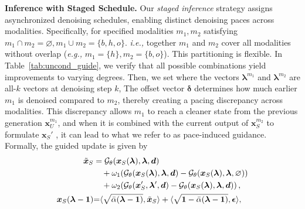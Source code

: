 \noindent \textbf{Inference with Staged Schedule.}
Our \emph{staged inference} strategy assigns asynchronized denoising schedules, enabling distinct denoising paces across modalities. Specifically, for specified modalities $m_1,m_2$ satisfying $m_1 \cap m_2 = \varnothing, m_1 \cup m_2 = \{b,h,o\}.$ \textit{i.e.,} together $m_1$ and $m_2$ cover all modalities without overlap (\textit{e.g.,} $m_1 = \{h\}, m_2 = \{b,o\}$). This partitioning is flexible. In Table~\ref{tab:uncond_guide}, we verify that all possible combinations yield improvements to varying degrees. 
Then, we set
where the vectors $\boldsymbol{\lambda}^{m_1}$ and $\boldsymbol{\lambda}^{m_2}$ are all-$k$ vectors at denoising step $k$,  The offset vector $\boldsymbol{\delta}$ determines how much earlier $m_1$ is denoised compared to $m_2$, thereby creating a pacing discrepancy across modalities. This discrepancy allows $m_1$ to reach a cleaner state from the previous generation ${\boldsymbol{x}}_U^{m_1}$, and when it is combined with the current output of ${\boldsymbol{x}}_S^{m_2}$ to formulate ${\boldsymbol{x}}_S'$ , it can lead to what we refer to as pace-induced guidance. Formally, the guided update is given by
\begin{align}
\tilde{\boldsymbol{x}}_{S}
&= \mathcal{G}_\theta(\boldsymbol{x}_{S}(\boldsymbol\lambda), \boldsymbol\lambda,\boldsymbol{d}) \notag \\
&\quad + \omega_{1}\!\left(\mathcal{G}_\theta(\boldsymbol{x}_{S}(\boldsymbol\lambda), \boldsymbol\lambda,\boldsymbol{d})
    - \mathcal{G}_\theta(\boldsymbol{x}_{S}(\boldsymbol\lambda), \boldsymbol\lambda,\varnothing)\right) \label{equation:textcfg2} \\
&\quad + \omega_{2}\!\left(\mathcal{G}_\theta(\boldsymbol{x}'_{S}, \boldsymbol\lambda',\boldsymbol{d})
    - \mathcal{G}_\theta(\boldsymbol{x}_{S}(\boldsymbol\lambda), \boldsymbol\lambda,\boldsymbol{d})\right) \label{equation:guidance_step}, \\
\mycolor{\boldsymbol{x}_S(\boldsymbol{\lambda} - \boldsymbol{1})}
&\mycolor{=} 
\mycolor{\langle \sqrt{\bar{\alpha}(\boldsymbol\lambda - \boldsymbol{1})}, \tilde{\boldsymbol{x}}_{S} \rangle 
+ \langle \sqrt{ \boldsymbol{1} - \bar{\alpha}(\boldsymbol\lambda - \boldsymbol{1})}, \boldsymbol{\epsilon} \rangle, \label{equation:guidance_denoise_step}}
\end{align}

